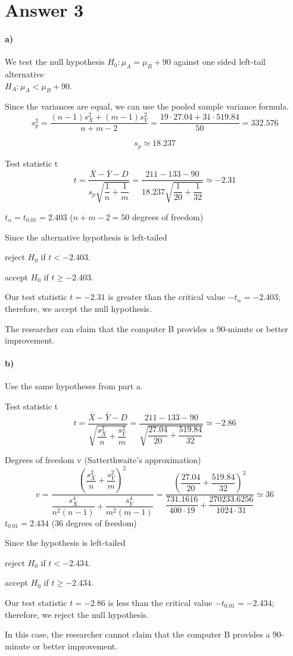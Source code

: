 \documentclass[12pt]{article}
\begin{document}
\section*{Answer 3}
\paragraph{a)}
We test the null hypothesis $H_0: \mu_A = \mu_B + 90$ against one sided left-tail alternative\\$H_A: \mu_A < \mu_B + 90$.

Since the variances are equal, we can use the pooled sample variance formula.
\[
    s_p^2 = \dfrac{(n-1)s_X^2 + (m-1)s_Y^2}{n+m-2} = \dfrac{19\cdot27.04 + 31\cdot519.84}{50} = 332.576
\]

\[
    s_p \simeq 18.237
\]

Test statistic t
\[
    t = \frac{\bar{X} - \bar{Y} - D}{s_p\sqrt{\dfrac{1}{n}+\dfrac{1}{m}}} = \frac{211 - 133 - 90}{18.237\sqrt{\dfrac{1}{20}+\dfrac{1}{32}}} \simeq -2.31
\]

$t_\alpha = t_{0.01} = 2.403$ ($n + m - 2 = 50$ degrees of freedom)

Since the alternative hypothesis is left-tailed
\begin{center}
    reject $H_0$ if $t < -2.403$.

    accept $H_0$ if $t \geq -2.403$.
\end{center}

Our test statistic $t = -2.31$ is greater than the critical value $-t_\alpha = -2.403$; therefore, we accept the null hypothesis.

The researcher can claim that the computer B provides a 90-minute or better improvement.
\paragraph{b)} Use the same hypotheses from part a.

Test statistic t
\[
    t = \frac{\bar{X} - \bar{Y} - D}{\sqrt{\dfrac{s_X^2}{n}+\dfrac{s_Y^2}{m}}} = \frac{211 - 133 - 90}{\sqrt{\dfrac{27.04}{20}+\dfrac{519.84}{32}}} \simeq -2.86
\]

Degrees of freedom v (Satterthwaite's approximation)
\[
    v = \dfrac{(\dfrac{s^2_X}{n}+\dfrac{s^2_Y}{m})^2}{\dfrac{s^4_X}{n^2(n-1)}+\dfrac{s^4_Y}{m^2(m-1)}} = \dfrac{(\dfrac{27.04}{20}+\dfrac{519.84}{32})^2}{\dfrac{731.1616}{400\cdot19}+\dfrac{270233.6256}{1024\cdot31}} \simeq 36
\]
$t_{0.01} = 2.434$ (36 degrees of freedom)

Since the hypothesis is left-tailed
\begin{center}
    reject $H_0$ if $t < -2.434$.

    accept $H_0$ if $t \geq -2.434$.
\end{center}

Our test statistic $t = -2.86$ is less than the critical value $-t_{0.01} = -2.434$; therefore, we reject the null hypothesis.

In this case, the researcher cannot claim that the computer B provides a 90-minute or better improvement.
\end{document}

